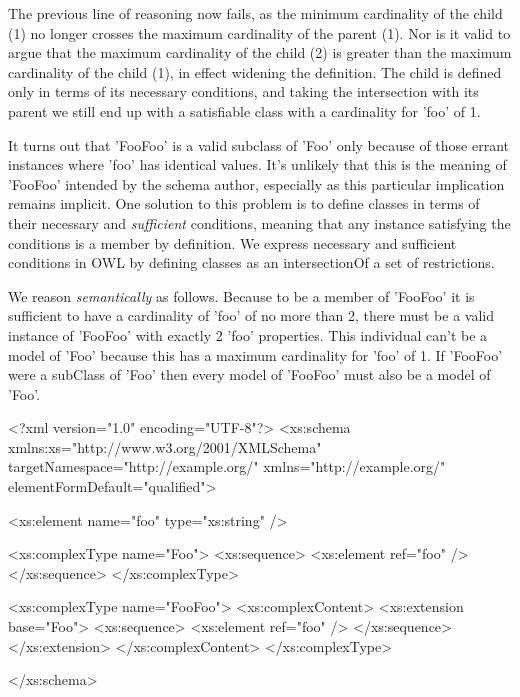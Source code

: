 The previous line of reasoning now fails, as the minimum cardinality of the child (1) no longer crosses the maximum cardinality of the parent (1). Nor is it valid to argue that the maximum cardinality of the child (2) is greater than the maximum cardinality of the child (1), in effect widening the definition. The child is defined only in terms of its necessary conditions, and taking the intersection with its parent we still end up with a satisfiable class with a cardinality for 'foo' of 1.

It turns out that 'FooFoo' is a valid subclass of 'Foo' only because of those errant instances where 'foo' has identical values. It's unlikely that this is the meaning of 'FooFoo' intended by the schema author, especially as this particular implication remains implicit. One solution to this problem is to define classes in terms of their necessary and {\itshape sufficient\/} conditions, meaning that any instance satisfying the conditions is a member by definition. We express necessary and sufficient conditions in OWL by defining classes as an intersectionOf a set of restrictions.

We reason {\itshape semantically\/} as follows. Because to be a member of 'FooFoo' it is sufficient to have a cardinality of 'foo' of no more than 2, there must be a valid instance of 'FooFoo' with exactly 2 'foo' properties. This individual can't be a model of 'Foo' because this has a maximum cardinality for 'foo' of 1. If 'FooFoo' were a subClass of 'Foo' then every model of 'FooFoo' must also be a model of 'Foo'.


\begin{DoxyCodeInclude}
<?xml version="1.0" encoding="UTF-8"?>
<xs:schema xmlns:xs="http://www.w3.org/2001/XMLSchema" 
        targetNamespace="http://example.org/" xmlns="http://example.org/"
        elementFormDefault="qualified">
        
        <xs:element name="foo" type="xs:string" />
                
        <xs:complexType name="Foo">
                <xs:sequence>
                        <xs:element ref="foo" />
                </xs:sequence>
        </xs:complexType>
        
        <xs:complexType name="FooFoo">
                <xs:complexContent>
                        <xs:extension base="Foo">
                                <xs:sequence>
                                        <xs:element ref="foo" />
                                </xs:sequence>
                        </xs:extension>
                </xs:complexContent>
        </xs:complexType>       
        
</xs:schema>
\end{DoxyCodeInclude}


